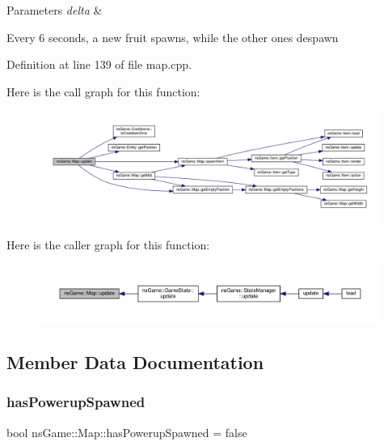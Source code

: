 \begin{DoxyParams}{Parameters}
{\em delta} & \\
\hline
\end{DoxyParams}
Every 6 seconds, a new fruit spawns, while the other ones despawn 

Definition at line 139 of file map.\+cpp.

Here is the call graph for this function\+:\nopagebreak
\begin{figure}[H]
\begin{center}
\leavevmode
\includegraphics[width=350pt]{classns_game_1_1_map_a2b7108ae33859839be0b85329f729de9_cgraph}
\end{center}
\end{figure}
Here is the caller graph for this function\+:\nopagebreak
\begin{figure}[H]
\begin{center}
\leavevmode
\includegraphics[width=350pt]{classns_game_1_1_map_a2b7108ae33859839be0b85329f729de9_icgraph}
\end{center}
\end{figure}


\subsection{Member Data Documentation}
\mbox{\label{classns_game_1_1_map_a494c2e9e96c882ca8f8661a62b87ce84}} 
\subsubsection{\texorpdfstring{has\+Powerup\+Spawned}{hasPowerupSpawned}}
{\footnotesize\ttfamily bool ns\+Game\+::\+Map\+::has\+Powerup\+Spawned = false}




